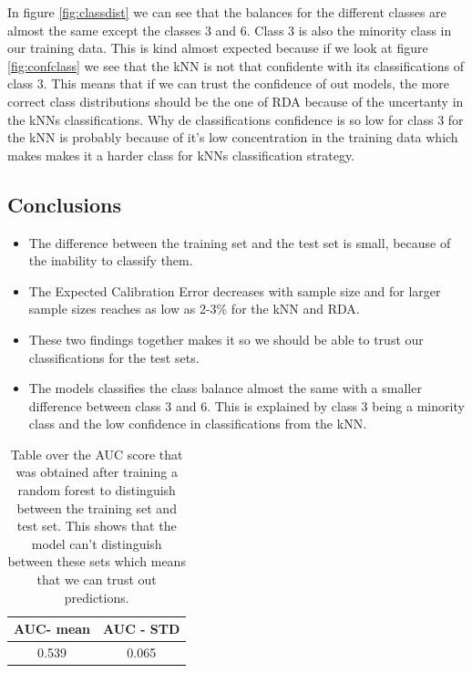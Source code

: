 \documentclass[11pt]{article}
\begin{document}
In figure \ref{fig:classdist} we can see that the balances for the different classes are almost the same except the classes 3 and 6. Class 3 is also the minority class in our training data. This is kind almost expected because if we look at figure \ref{fig:confclass} we see that the kNN is not that confidente with its classifications of class 3. This means that if we can trust the confidence of out models, the more correct class distributions should be the one of RDA because of the uncertanty in the kNNs classifications. Why de classifications confidence is so low for class 3 for the kNN is probably because of it's low concentration in the training data which makes makes it a harder class for kNNs classification strategy.

\newpage
\subsection{Conclusions}
\begin{itemize}
	\item The difference between the training set and the test set is small, because of the inability to classify them.
	\item The Expected Calibration Error decreases with sample size and for larger sample sizes reaches as low as 2-3\% for the kNN and RDA.
	\item These two findings together makes it so we should be able to trust our classifications for the test sets.
	\item The models classifies the class balance almost the same with a smaller difference between class 3 and 6. This is explained by class 3 being a minority class and the low confidence in classifications from the kNN.
\end{itemize}
\newpage

\begin{table}[H]
	\centering
	\begin{tabular}{|c|c|}
		\hline
		\textbf{AUC- mean} & \textbf{AUC - STD} \\ \hline
		0.539              & 0.065              \\ \hline
	\end{tabular}
	\caption{Table over the AUC score that was obtained after training a random forest to distinguish between the training set and test set. This shows that the model can't distinguish between these sets which means that we can trust out predictions.}
	\label{tab:rf-score}
\end{table}
\end{document}
